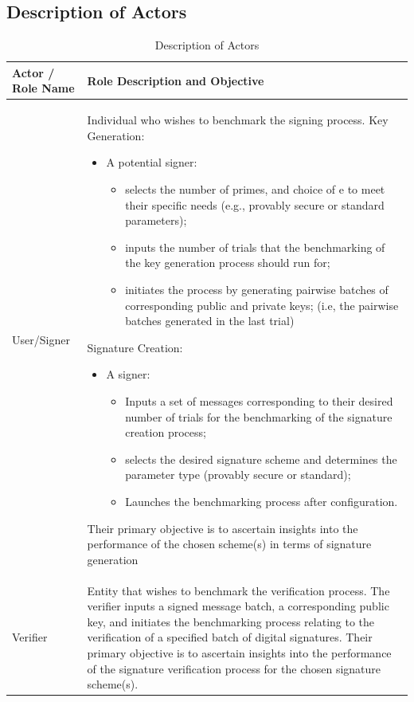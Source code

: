 \documentclass[]{final_report}
\theoremstyle{definition}
\begin{document}
\subsection{Description of Actors}
\begin{table}[H]
    \centering
    \caption{Description of Actors}
    \label{tab:actors_description}
    \begin{tabular}{|l|p{10cm}|}
    \hline
    \textbf{Actor / Role Name} & \textbf{Role Description and Objective} \\
    \hline
    User/Signer & Individual who wishes to benchmark the signing process. Key Generation: \begin{itemize}
\item A potential signer:
\begin{itemize}
\item selects the number of primes, and choice of e to meet their specific needs (e.g., provably secure or standard parameters); 
\item inputs the number of trials that the benchmarking of the key generation process should run for;
\item initiates the process by generating pairwise batches of corresponding public and private keys; (i.e, the pairwise batches generated in the last trial) 
\end{itemize} 
\end{itemize} 
Signature Creation: \begin{itemize}
\item A signer:

\begin{itemize}
\item Inputs a set of messages corresponding to their desired number of trials for the benchmarking of the signature creation process;
\item selects the desired signature scheme and determines the parameter type (provably secure or standard);
\item Launches the benchmarking process after configuration.
\end{itemize}  
\end{itemize} 
Their primary objective is to ascertain insights into the performance of the chosen scheme(s) in terms of signature generation\\
    \hline
    Verifier & Entity that wishes to benchmark the verification process. The verifier inputs a signed message batch, a corresponding public key, and initiates the benchmarking process relating to the verification of a specified batch of digital signatures. Their primary objective is to ascertain insights into the performance of the signature verification process for the chosen signature scheme(s). \\
    \hline
    \end{tabular}
\end{table}
\end{document}
